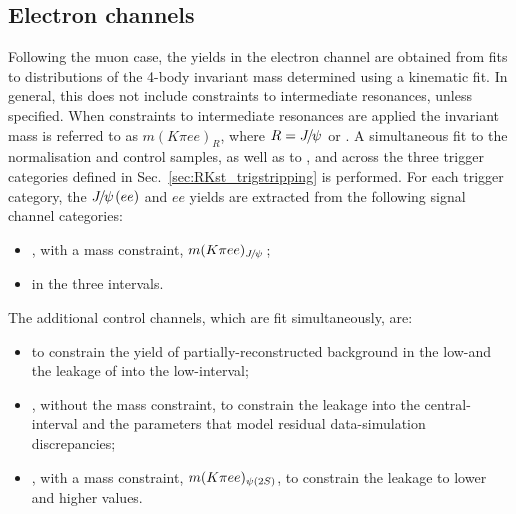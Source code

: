 \clearpage

\subsection{Electron channels}
\label{sec:RKst_fit_ee}

Following the muon case, the yields in the electron channel are obtained from fits to 
distributions of the 4-body invariant mass determined using a kinematic fit.
In general, this does not include constraints to intermediate resonances, unless specified.
When constraints to intermediate resonances are applied the invariant mass is referred to as
$m(K\pi ee)_R$, where $R = \jpsi$ or \psitwos.
A simultaneous fit to the normalisation and control samples, as well as to \BdToKstee, and
across the three trigger categories defined in Sec.~\ref{sec:RKst_trigstripping} is performed.
%
For each trigger category, the $\jpsi(ee)$ and $ee$ yields are extracted from the following signal channel categories:
%
\begin{itemize}
\item \BdToKstJPsee, with a \jpsi mass constraint, $m(K\pi ee)_{\jpsi}$;
\item \BdToKstee in the three \qsq intervals.
\end{itemize}

The additional control channels, which are fit simultaneously, are:
%
\begin{itemize}
\item \BdToKstGee to constrain the yield of partially-reconstructed   background 
in the low-\qsq and the leakage of \BdToKstG into the low-\qsq interval;
\item \BdToKstJPsee, without the \jpsi mass constraint, to constrain the leakage into the 
central-\qsq interval and the parameters that model residual data-simulation discrepancies;
\item \BdToKstPsiee, with a \psitwos mass constraint,  $m(K\pi ee)_{\psitwos}$, to constrain the leakage to lower and higher \qsq values.
\end{itemize}


